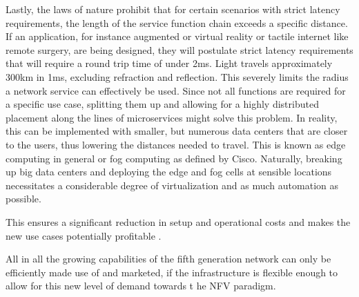Lastly, the laws of nature prohibit that for certain scenarios with strict latency requirements, the length of the service function chain exceeds a specific distance. If an application, for instance augmented or virtual reality or tactile internet like remote surgery, are being designed, they will postulate strict latency requirements that will require a round trip time of under 2ms. Light travels approximately 300km in 1ms, excluding refraction and reflection. This severely limits the radius a network service can effectively be used. Since not all functions are required for a specific use case, splitting them up and allowing for a highly distributed placement along the lines of microservices might solve this problem. In reality, this can be implemented with smaller, but numerous data centers that are closer to the users, thus lowering the distances needed to travel. This is known as edge computing in general or fog computing as defined by Cisco.
Naturally, breaking up big data centers and deploying the edge and fog cells at sensible locations necessitates a considerable degree of virtualization and as much automation as possible. 

This ensures a significant reduction in setup and operational costs and makes the new use cases potentially profitable \cite{cn5gvnf} \cite{nfv_wp} \cite{ordonez2017network} \cite{nfv_etsi} \cite{abdelwahab2016network} \cite{nfv5g} \cite{alexgalis2018multi} \cite{alexgalis2017analysis} \cite{de2019network} \cite{condoluci2018softwarization}. 

All in all the growing capabilities of the fifth generation network can only be efficiently made use of and marketed, if the infrastructure is flexible enough to allow for this new level of demand towards t he NFV paradigm. 

